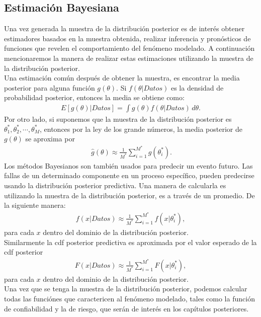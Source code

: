 \subsection{Estimaci\'on  Bayesiana}
\noindent Una vez generada la muestra de la distribuci\'on posterior es de inter\'es obtener estimadores basados en la muestra obtenida, realizar inferencia y pron\'osticos de funciones que revelen el comportamiento del fen\'omeno modelado. A continuaci\'on mencionaremos la manera de realizar estas estimaciones utilizando la muestra de la distribuci\'on posterior.\\


\noindent Una estimaci\'on com\'un despu\'es de obtener la muestra,  es encontrar la media posterior para alguna funci\'on $g(\theta)$.
\noindent Si $f(\theta|Datos)$ es la densidad de probabilidad posterior, entonces la media se obtiene como:
\begin{eqnarray}\label{a}
E[g(\theta)|Datos]=\int g(\theta)f(\theta|Datos)\,d\theta.
\end{eqnarray}
Por otro lado, si suponemos que la muestra  de la distribuci\'on posterior es $\theta_1^{*},\theta_2^{*},\cdots,\theta_M^{*}$, entonces por la ley de los grande n\'umeros, la media posterior de $g(\theta)$ se aproxima por
\begin{eqnarray*}\
\hat{g}(\theta)\approx\frac{1}{M^{*}}\sum_{i=1}^{M^{*}}g(\theta_i^{*}).
\end{eqnarray*}
\noindent Los m\'etodos Bayesianos son tambi\'en usados para predecir un evento futuro. Las fallas de un determinado componente en un proceso espec\'ifico, pueden predecirse usando la distribuci\'on posterior predictiva. Una manera de calcularla es utilizando la muestra de la distribuci\'on posterior, es a trav\'es de un promedio. De la siguiente manera:
\begin{eqnarray}\label{c}
f (x|Datos)\approx \frac{1}{M^*}\sum_{i=1}^{M^*}f(x|\theta_i^*),
\end{eqnarray}
\noindent para cada $x$ dentro del dominio de la distribuci\'on posterior.\\[0.1cm]

\noindent Similarmente la cdf posterior predictiva es aproximada por el valor esperado de la cdf posterior 
\begin{eqnarray}\label{b}
F(x|Datos)\approx \frac{1}{M^*}\sum_{i=1}^{M^*}F(x|\theta_i^*),
\end{eqnarray}
\noindent para cada $x$ dentro del dominio de la distribuci\'on posterior.\\[0.1cm]



\noindent Una vez que se tenga la muestra de la distribuci\'on posterior, podemos calcular todas las funci\'ones que caractericen al fen\'omeno modelado, tales como la funci\'on de confiabilidad y la de riesgo, que ser\'an de inter\'es en los cap\'itulos posteriores.
\newpage \thispagestyle{empty} \cleardoublepage
